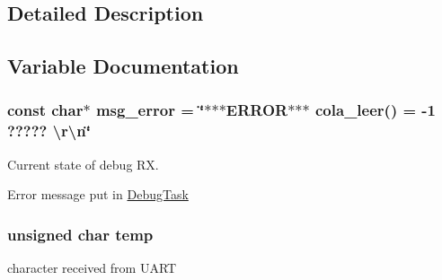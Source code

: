 \subsection{Detailed Description}


\subsection{Variable Documentation}
\subsubsection[{\texorpdfstring{msg\+\_\+error}{msg_error}}]{\setlength{\rightskip}{0pt plus 5cm}const char$\ast$ msg\+\_\+error = \char`\"{}$\ast$$\ast$$\ast$E\+R\+R\+OR$\ast$$\ast$$\ast$ {\bf cola\+\_\+leer}() = -\/1 ????? \textbackslash{}r\textbackslash{}n\char`\"{}\hspace{0.3cm}{\ttfamily [static]}}\hypertarget{group___debug___private___variables_ga57ad017acd4535fe089f54ed903b3e9e}{}\label{group___debug___private___variables_ga57ad017acd4535fe089f54ed903b3e9e}


Current state of debug RX. 

Error message put in \hyperlink{group___debug___exported___functions___group2_ga0e7fca846e34e06a1f62249fe8a30a44}{Debug\+Task} 
\subsubsection[{\texorpdfstring{temp}{temp}}]{\setlength{\rightskip}{0pt plus 5cm}unsigned char temp\hspace{0.3cm}{\ttfamily [static]}}\hypertarget{group___debug___private___variables_gabe413cb96d839cbe31417aa52d920f21}{}\label{group___debug___private___variables_gabe413cb96d839cbe31417aa52d920f21}
character received from U\+A\+RT 